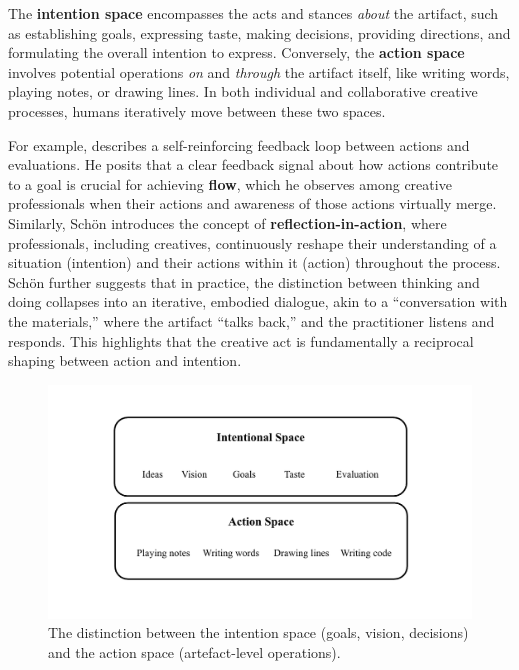 The \textbf{intention space} encompasses the acts and stances \textit{about} the artifact, such as establishing goals, expressing taste, making decisions, providing directions, and formulating the overall intention to express. Conversely, the \textbf{action space} involves potential operations \textit{on} and \textit{through} the artifact itself, like writing words, playing notes, or drawing lines. In both individual and collaborative creative processes, humans iteratively move between these two spaces.

For example, \cite{Csikszentmihalyi1997-ui} describes a self-reinforcing feedback loop between actions and evaluations. He posits that a clear feedback signal about how actions contribute to a goal is crucial for achieving \textbf{flow}, which he observes among creative professionals when their actions and awareness of those actions virtually merge. Similarly, Schön \cite{Schon1987-fy} introduces the concept of \textbf{reflection-in-action}, where professionals, including creatives, continuously reshape their understanding of a situation (intention) and their actions within it (action) throughout the process. Schön \cite{Schon1992-jt} further suggests that in practice, the distinction between thinking and doing collapses into an iterative, embodied dialogue, akin to a “conversation with the materials,” where the artifact “talks back,” and the practitioner listens and responds. This highlights that the creative act is fundamentally a reciprocal shaping between action and intention.

\begin{figure}[H]
 \centering
\includegraphics[width=1\linewidth]{intention action spaces.png}
 \caption{The distinction between the intention space (goals, vision, decisions) and the action space (artefact-level operations).}
 \label{fig:intention-action-spaces}
\end{figure}

